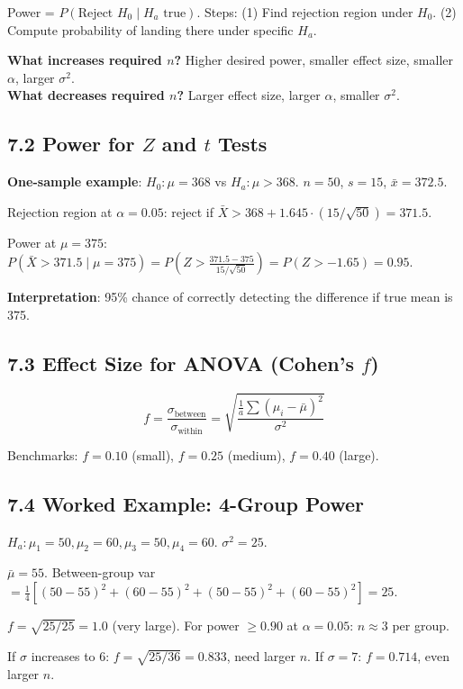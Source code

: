 \documentclass[9pt,letterpaper]{article}
\begin{document}
Power = $P(\text{Reject } H_0 \mid H_a \text{ true})$. Steps: (1) Find rejection region under $H_0$. (2) Compute probability of landing there under specific $H_a$.

\begin{keybox}
\textbf{What increases required $n$?} Higher desired power, smaller effect size, smaller $\alpha$, larger $\sigma^2$.\\
\textbf{What decreases required $n$?} Larger effect size, larger $\alpha$, smaller $\sigma^2$.
\end{keybox}

\subsection{7.2 Power for $Z$ and $t$ Tests}

\textbf{One-sample example}: $H_0:\mu=368$ vs $H_a:\mu>368$. $n=50$, $s=15$, $\bar{x}=372.5$.

Rejection region at $\alpha=0.05$: reject if $\bar{X} > 368 + 1.645\cdot(15/\sqrt{50}) = 371.5$.

Power at $\mu=375$: $P(\bar{X}>371.5 \mid \mu=375) = P\!\left(Z > \frac{371.5-375}{15/\sqrt{50}}\right) = P(Z > -1.65) = 0.95$.

\textbf{Interpretation}: 95\% chance of correctly detecting the difference if true mean is 375.

\subsection{7.3 Effect Size for ANOVA (Cohen's $f$)}

\[
f = \frac{\sigma_{\text{between}}}{\sigma_{\text{within}}} = \sqrt{\frac{\frac{1}{a}\sum(\mu_i - \bar\mu)^2}{\sigma^2}}
\]

Benchmarks: $f=0.10$ (small), $f=0.25$ (medium), $f=0.40$ (large).

\subsection{7.4 Worked Example: 4-Group Power}

$H_a: \mu_1=50, \mu_2=60, \mu_3=50, \mu_4=60$. $\sigma^2=25$.

$\bar\mu = 55$. Between-group var $= \frac{1}{4}[(50-55)^2+(60-55)^2+(50-55)^2+(60-55)^2] = 25$.

$f = \sqrt{25/25} = 1.0$ (very large). For power $\ge 0.90$ at $\alpha=0.05$: $n \approx 3$ per group.

If $\sigma$ increases to 6: $f = \sqrt{25/36} = 0.833$, need larger $n$. If $\sigma=7$: $f=0.714$, even larger $n$.
\end{document}
